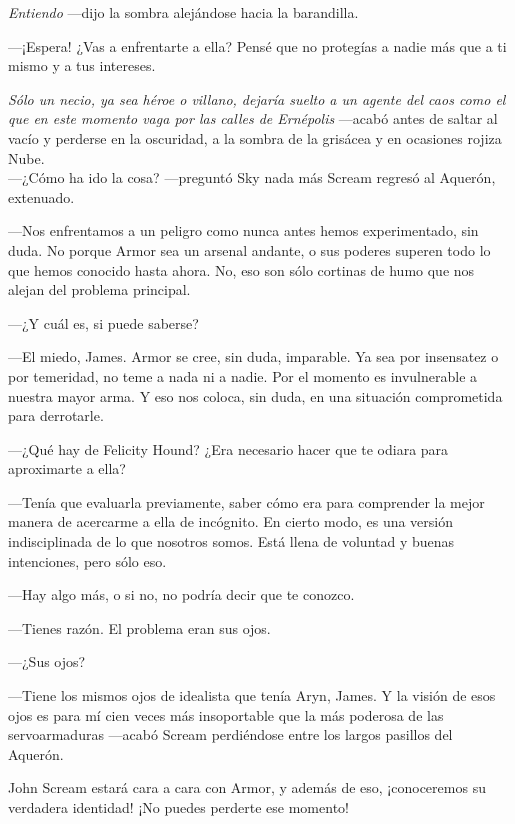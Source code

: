 \emph{Entiendo} ---dijo la sombra alejándose hacia la barandilla.

---¡Espera! ¿Vas a enfrentarte a ella? Pensé que no protegías a nadie más que a ti mismo y a tus intereses.

\emph{Sólo un necio, ya sea héroe o villano, dejaría suelto a un agente del caos como el que en este momento vaga por las calles de Ernépolis} ---acabó antes de saltar al vacío y perderse en la oscuridad, a la sombra de la grisácea y en ocasiones rojiza Nube.\\

\noindent{}---¿Cómo ha ido la cosa? ---preguntó Sky nada más Scream regresó al Aquerón, extenuado.

---Nos enfrentamos a un peligro como nunca antes hemos experimentado, sin duda. No porque Armor sea un arsenal andante, o sus poderes superen todo lo que hemos conocido hasta ahora. No, eso son sólo cortinas de humo que nos alejan del problema principal.

---¿Y cuál es, si puede saberse?

---El miedo, James. Armor se cree, sin duda, imparable. Ya sea por insensatez o por temeridad, no teme a nada ni a nadie. Por el momento es invulnerable a nuestra mayor arma. Y eso nos coloca, sin duda, en una situación comprometida para derrotarle.

---¿Qué hay de Felicity Hound? ¿Era necesario hacer que te odiara para aproximarte a ella?

---Tenía que evaluarla previamente, saber cómo era para comprender la mejor manera de acercarme a ella de incógnito. En cierto modo, es una versión indisciplinada de lo que nosotros somos. Está llena de voluntad y buenas intenciones, pero sólo eso.

---Hay algo más, o si no, no podría decir que te conozco.

---Tienes razón. El problema eran sus ojos.

---¿Sus ojos?

---Tiene los mismos ojos de idealista que tenía Aryn, James. Y la visión de esos ojos es para mí cien veces más insoportable que la más poderosa de las servoarmaduras ---acabó Scream perdiéndose entre los largos pasillos del Aquerón.

\begin{next}
    John Scream estará cara a cara con Armor, y además de eso, ¡conoceremos su verdadera identidad! ¡No puedes perderte ese momento!
\end{next}

\endinput
